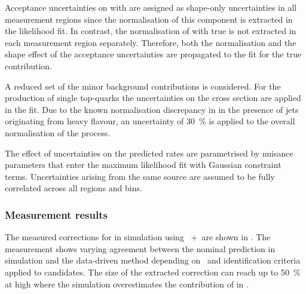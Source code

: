 Acceptance uncertainties on \ttbar with \faketauhadvis are assigned as
shape-only uncertainties in all measurement regions since the
normalisation of this component is extracted in the likelihood fit.
In contrast, the normalisation of \ttbar with true \tauhadvis is not
extracted in each measurement region separately. Therefore, both the
normalisation and the shape effect of the \ttbar acceptance
uncertainties are propagated to the fit for the true \tauhadvis
contribution.

A reduced set of the minor background contributions is considered. For
the production of single top-quarks the uncertainties on the cross
section are applied in the fit. Due to the known normalisation
discrepancy in \Vjets in the presence of jets originating from heavy
flavour, an uncertainty of \SI{30}{\percent} is applied to the overall
normalisation of the process.

The effect of uncertainties on the predicted rates are parametrised by
nuisance parameters that enter the maximum likelihood fit with
Gaussian constraint terms. Uncertainties arising from the same source
are assumed to be fully correlated across all regions and bins.



\subsubsection{Measurement results}

The measured corrections for \faketauhadvis in \ttbar simulation using
\POWHEGBOX[v2]~+~\PYTHIA[8] are shown in
. The measurement shows varying agreement
between the nominal prediction in simulation and the data-driven
method depending on \tauhadvis~\pT and identification criteria applied
to \tauhadvis candidates. The size of the extracted correction can
reach up to \SI{50}{\percent} at high \tauhadvis \pT where the
simulation overestimates the contribution of \faketauhadvis in \ttbar.

